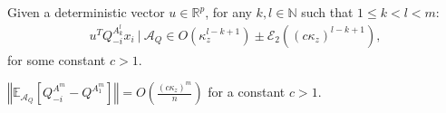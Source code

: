 \documentclass[a4papaer, titlepage]{book}
\begin{document}
\begin{lemma}\label{lem:concentration_uQ^A^mx}
  Given a deterministic vector $u \in \mathbb R^p$, for any $k,l \in \mathbb N$ such that $1\leq k<l <m$:
  \begin{align*}
    u^T Q_{-i}^{A_k^l}x_i  \ | \ \mathcal A_Q \in O \left( \kappa_z^{l-k+1} \right) \pm \mathcal E_2 \left((c\kappa_z)^{l-k+1}  \right),
  \end{align*}
  for some constant $c>1$.
\end{lemma}
\begin{corollary}\label{cor:diff_Q^m_Q_-1^m}
  $\left\Vert \mathbb E_{\mathcal A_Q} [ Q_{-i}^{A^m} - Q^{A_1^m}]\right\Vert = O \left(\frac{(c\kappa_z)^m}{n}\right)$ for a constant $c>1$.
\end{corollary}
\end{document}
